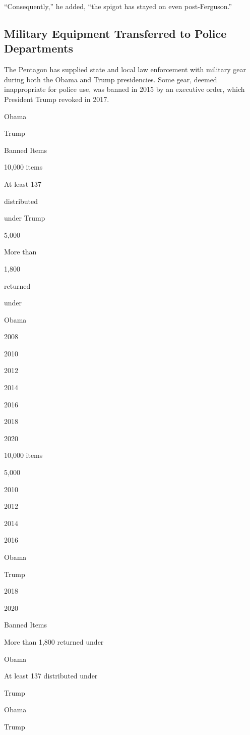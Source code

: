 ``Consequently,'' he added, ``the spigot has stayed on even
post-Ferguson.''

\hypertarget{military-equipment-transferred-to-police-departments}{%
\subsection{Military Equipment Transferred to Police
Departments}\label{military-equipment-transferred-to-police-departments}}

The Pentagon has supplied state and local law enforcement with military
gear during both the Obama and Trump presidencies. Some gear, deemed
inappropriate for police use, was banned in 2015 by an executive order,
which President Trump revoked in 2017.

Obama

Trump

Banned Items

10,000 items

At least 137

distributed

under Trump

5,000

More than

1,800

returned

under

Obama

2008

2010

2012

2014

2016

2018

2020

10,000 items

5,000

2010

2012

2014

2016

Obama

Trump

2018

2020

Banned Items

More than 1,800 returned under

Obama

At least 137 distributed under

Trump

Obama

Trump

